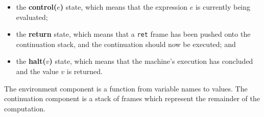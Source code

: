 \documentclass[12pt,a4paper,twoside,openright]{report}
\begin{document}
\begin{itemize}
\item the \textbf{control($e$)} state, which means that the expression $e$ is currently being evaluated;
\item the \textbf{return} state, which means that a \texttt{ret} frame has been pushed onto the continuation stack, and the continuation should now be executed; and
\item the \textbf{halt($v$)} state, which means that the machine's execution has concluded and the value $v$ is returned.
\end{itemize}

The environment component is a function from variable names to values. The continuation component is a stack of frames which represent the remainder of the computation.
\end{document}
